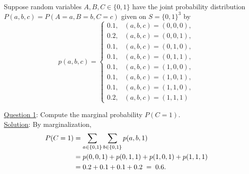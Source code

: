 \begin{example}\label{ex:abc}

Suppose random variables $A,B,C \in \{0,1\}$ have the joint probability distribution $P(a,b,c)=P(A=a,B=b,C=c)$ given on $S = \{0,1\}^3$ by
\begin{equation}
p(a,b,c)=
\begin{cases}
0.1, & (a,b,c)=(0,0,0),\\
0.2, & (a,b,c)=(0,0,1),\\
0.1, & (a,b,c)=(0,1,0),\\
0.1, & (a,b,c)=(0,1,1),\\
0.1, & (a,b,c)=(1,0,0),\\
0.1, & (a,b,c)=(1,0,1),\\
0.1, & (a,b,c)=(1,1,0),\\
0.2, & (a,b,c)=(1,1,1)
\end{cases}
\label{eq:pmf}
\end{equation}

\noindent
\underline{Question 1}: Compute the marginal probability $P(C=1)$.\\

\noindent
\underline{Solution}: By marginalization,
\begin{align}
P(C=1)
&= \sum_{a\in\{0,1\}}\sum_{b\in\{0,1\}} p(a,b,1) \notag\\
&= p(0,0,1)+p(0,1,1)+p(1,0,1)+p(1,1,1) \notag\\
&= 0.2+0.1+0.1+0.2 \;=\; 0.6.
\label{eq:margC1}
\end{align}

\medskip
\noindent
\end{example}

